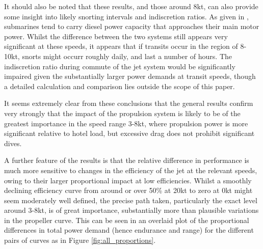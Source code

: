 \documentclass{article}\usepackage[]{graphicx}\usepackage[]{color}
\begin{document}
It should also be noted that these results, and those around 8kt, can also provide some insight into likely snorting intervals and indiscretion ratios.  As given in \cite{patrick2012}, submarines tend to carry diesel power capacity that approaches their main motor power. Whilst the difference between the two systems still appears very significant at these speeds, it appears that if transits occur in the region of 8-10kt, snorts might occurr roughly daily, and last a number of hours.  The indiscretion ratio during commute of the jet system would be significantly impaired given the substantially larger power demands at transit speeds, though a detailed calculation and comparison lies outside the scope of this paper.

It seems extremely clear from these conclusions that the general results confirm very strongly that the impact of the propulsion system is likely to be of the greatest importance in the speed range 3-8kt, where propulsion power is more significant relative to hotel load, but excessive drag does not prohibit significant dives.

A further feature of the results is that the relative difference in performance is much more sensitive to changes in the efficiency of the jet at the relevant speeds, owing to their larger proportional impact at low efficiencies.  Whilst a smoothly declining efficiency curve from around or over 50\% at 20kt to zero at 0kt might seem moderately well defined, the precise path taken, particularly the exact level around 3-8kt, is of great importance, substantially more than plausible variations in the propeller curve.  This can be seen in an overlaid plot of the proportional differences in total power demand (hence endurance and range) for the different pairs of curves as in Figure \ref{fig:all_proportions}.
\end{document}
